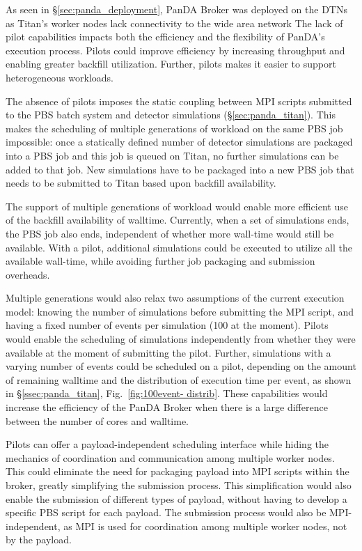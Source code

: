 As seen in \S\ref{sec:panda_deployment}, PanDA Broker was  deployed on the DTNs
as Titan's worker nodes lack connectivity to the wide area network The lack of
pilot capabilities impacts both the efficiency and the flexibility of PanDA's
execution process. Pilots could improve efficiency by increasing throughput and
enabling greater backfill utilization. Further, pilots makes it easier to
support heterogeneous workloads.

The absence of pilots imposes the static coupling between MPI scripts
submitted to the PBS batch system and detector simulations
(\S\ref{sec:panda_titan}). This makes the scheduling of multiple generations
of workload on the same PBS job impossible: once a statically defined number
of detector simulations are packaged into a PBS job and this job is queued on
Titan, no further simulations can be added to that job. New simulations have
to be packaged into a new PBS job that needs to be submitted to Titan based
upon backfill availability.

The support of  multiple generations of workload would enable more efficient use
of the backfill availability of walltime. Currently, when a set of simulations
ends, the PBS job also ends, independent of whether more wall-time would still
be available. With a pilot, additional simulations could be executed  to utilize
all the available wall-time, while avoiding further job packaging and submission
overheads.

Multiple generations would also relax two assumptions of the current execution
model: knowing the number of simulations before submitting the MPI script, and
having a fixed number of events per simulation (100 at the moment). Pilots would
enable the scheduling of simulations independently from whether they were
available at the moment of submitting the pilot. Further, simulations with a
varying number of events could be scheduled on a pilot, depending on the amount
of remaining walltime and the distribution of execution time per event, as shown
in \S\ref{ssec:panda_titan}, Fig.~\ref{fig:100event- distrib}. These
capabilities would increase the efficiency of the PanDA Broker when there is a
large difference between the number of cores and walltime.

Pilots can offer a payload-independent scheduling interface while hiding the
mechanics of coordination and communication among multiple worker nodes. This
could eliminate the need for packaging payload into MPI scripts within the
broker, greatly simplifying the submission process. This simplification would
also enable the submission of different types of payload, without having to
develop a specific PBS script for each payload. The submission process would
also be MPI-independent, as MPI is used for coordination among multiple worker
nodes, not by the payload.

